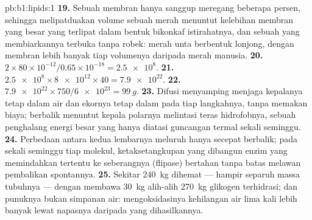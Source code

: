 \begin{solution}{pb:b1:lipids:1}
\textbf{19.} Sebuah membran hanya sanggup meregang beberapa persen,
sehingga melipatduakan volume sebuah  merah menuntut kelebihan
membran yang besar yang terlipat dalam bentuk bikonkaf istirahatnya, dan
sebuah  yang membiarkannya terbuka tanpa robek:  merah unta
berbentuk lonjong, dengan membran lebih banyak tiap volumenya daripada
 merah manusia.
\textbf{20.} $2\times 80\times 10^{-12}/0.65\times 10^{-18} = \num{2.5e8}$.
\textbf{21.} $\num{2.5e8}\times\num{8e12}\times 40 = \num{7.9e22}$.
\textbf{22.} $\num{7.9e22}\times 750/\num{6e23} = \qty{99}{g}$.
\textbf{23.} Difusi menyamping menjaga kepalanya tetap dalam air dan
ekornya tetap dalam  pada tiap langkahnya, tanpa memakan biaya;
berbalik menuntut kepala polarnya melintasi teras hidrofobnya, sebuah
penghalang energi besar yang hanya diatasi guncangan termal sekali
seminggu.
\textbf{24.} Perbedaan antara kedua lembarnya meluruh hanya secepat
 berbalik; pada sekali seminggu tiap molekul, ketaksetangkupan
yang dibangun enzim yang memindahkan  tertentu ke seberangnya
(flipase) bertahan tanpa batas melawan pembalikan spontannya.
\textbf{25.} Sekitar \qty{240}{kg} dihemat --- hampir separuh massa
tubuhnya --- dengan membawa \qty{30}{kg}  alih-alih \qty{270}{kg}
glikogen terhidrasi; dan punuknya bukan simpanan air: mengoksidasinya
kehilangan air lima kali lebih banyak lewat napasnya daripada yang
dihasilkannya.
\end{solution}
